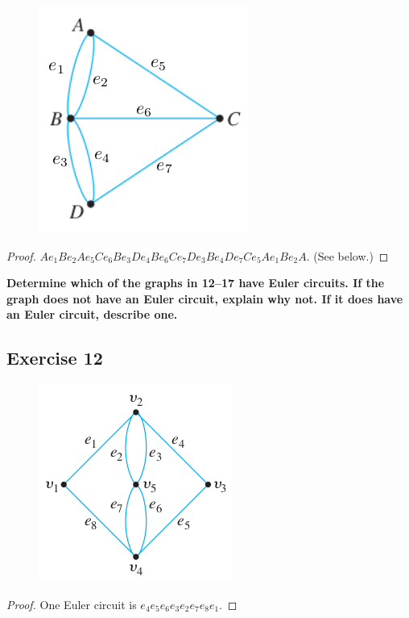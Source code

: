\documentclass[14pt]{extarticle}
\newcommand{\cy}{\color{cyan}}
\begin{document}
\begin{figure}[ht!]
\centering
\includegraphics[scale=0.4]{../images/10.1.11.png}
\end{figure}

\begin{proof}
\(Ae_1Be_2Ae_5Ce_6Be_3De_4Be_6Ce_7De_3Be_4De_7Ce_5Ae_1Be_2A\). (See below.)
\end{proof}

{\bf \cy Determine which of the graphs in 12–17 have Euler circuits. If the graph does not have an Euler circuit, explain 
why not. If it does have an Euler circuit, describe one.}

\subsection{Exercise 12}
\begin{figure}[ht!]
\centering
\includegraphics[scale=0.4]{../images/10.1.12.png}
\end{figure}

\begin{proof}
One Euler circuit is \(e_4e_5e_6e_3e_2e_7e_8e_1\).
\end{proof}
\end{document}
